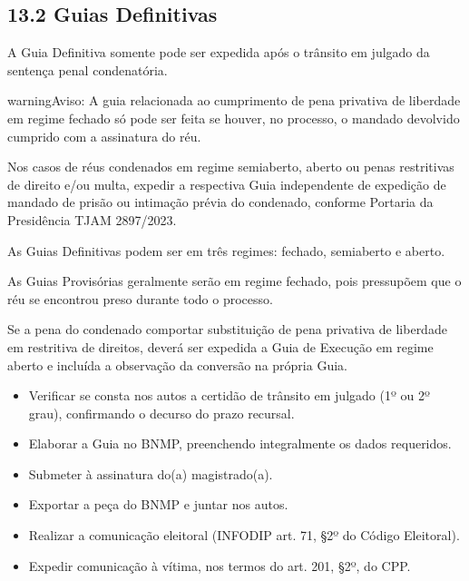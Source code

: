 \documentclass[letterpaper,10pt,brazil]{sphinxmanual}
\begin{document}
\subsection{13.2 \textendash{} Guias Definitivas}
\label{\detokenize{10expedir_guia_execucao:guias-definitivas}}
\sphinxAtStartPar
A Guia Definitiva somente pode ser expedida após o trânsito em julgado da sentença penal condenatória.

\begin{sphinxadmonition}{warning}{Aviso:}
\sphinxAtStartPar
A guia relacionada ao cumprimento de pena privativa de liberdade em regime fechado só pode ser feita se houver, no processo, o mandado devolvido cumprido com a assinatura do réu.

\sphinxAtStartPar
Nos casos de réus condenados em regime semiaberto, aberto ou penas restritivas de direito e/ou multa, expedir a respectiva Guia independente de expedição de mandado de prisão ou intimação prévia do condenado, conforme Portaria da Presidência TJAM 2897/2023.
\end{sphinxadmonition}

\sphinxAtStartPar
As Guias Definitivas podem ser em três regimes: fechado, semiaberto e aberto.

\sphinxAtStartPar
As Guias Provisórias geralmente serão em regime fechado, pois pressupõem que o réu se encontrou preso durante todo o processo.

\sphinxAtStartPar
Se a pena do condenado comportar substituição de pena privativa de liberdade em restritiva de direitos, deverá ser expedida a Guia de Execução em regime aberto e incluída a observação da conversão na própria Guia.

\sphinxAtStartPar
{}
\begin{itemize}
\item {} 
\sphinxAtStartPar
Verificar se consta nos autos a certidão de trânsito em julgado (1º ou 2º grau), confirmando o decurso do prazo recursal.

\item {} 
\sphinxAtStartPar
Elaborar a Guia no BNMP, preenchendo integralmente os dados requeridos.

\item {} 
\sphinxAtStartPar
Submeter à assinatura do(a) magistrado(a).

\item {} 
\sphinxAtStartPar
Exportar a peça do BNMP e juntar nos autos.

\item {} 
\sphinxAtStartPar
Realizar a comunicação eleitoral (INFODIP \textendash{} art. 71, \S{}2º do Código Eleitoral).

\item {} 
\sphinxAtStartPar
Expedir comunicação à vítima, nos termos do art. 201, \S{}2º, do CPP.

\end{itemize}
\end{document}
